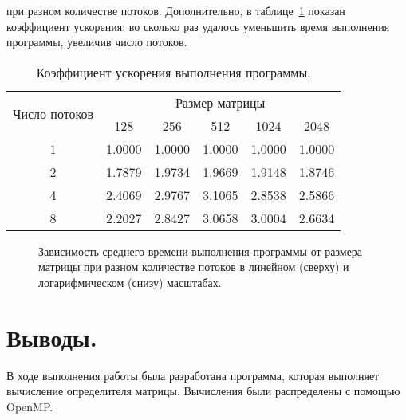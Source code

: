 \documentclass[a4paper,14pt]{extarticle}
\begin{document}
    при разном количестве потоков.
    Дополнительно, в таблице~\ref{tab:resm} показан коэффициент ускорения:
    во сколько раз удалось уменьшить время выполнения программы, увеличив число потоков.
    \begin{table}[h!]
        \centering
        \begin{tabular}{cccccc}
            \toprule
            \multirow{2}{*}{Число потоков} & \multicolumn{5}{c}{Размер матрицы} \\
            \cmidrule(l){2-6}
            &  128 & 256 & 512 & 1024 & 2048 \\
            \midrule
            1 & 1.0000 & 1.0000 & 1.0000 & 1.0000 & 1.0000 \\
            2 & 1.7879 & 1.9734 & 1.9669 & 1.9148 & 1.8746 \\
            4 & 2.4069 & 2.9767 & 3.1065 & 2.8538 & 2.5866 \\
            8 & 2.2027 & 2.8427 & 3.0658 & 3.0004 & 2.6634 \\
            \bottomrule
        \end{tabular}
        \caption{Коэффициент ускорения выполнения программы.}
        \label{tab:resm}
    \end{table}

    \begin{figure}[p]
        \centering
        
        
        \caption{
            Зависимость среднего времени выполнения программы от размера матрицы при разном количестве потоков
            в линейном (сверху) и логарифмическом (снизу) масштабах.
        }
        \label{fig:res}
    \end{figure}

    \section{Выводы.}

    В ходе выполнения работы была разработана программа, которая выполняет вычисление определителя матрицы.
    Вычисления были распределены с помощью OpenMP\@.
\end{document}
